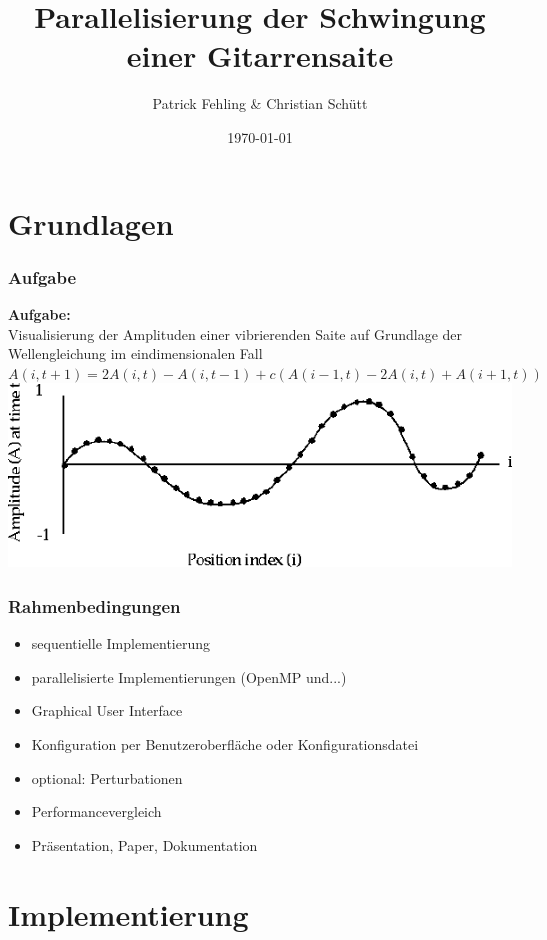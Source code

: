 \documentclass[xcolor=dvipsnames]{beamer}
\title{Parallelisierung der Schwingung einer Gitarrensaite}
\author{Patrick Fehling \& Christian Schütt}
\date{\today}
\begin{document}
\maketitle
\frame{\tableofcontents}

\section{Grundlagen}
\begin{frame}\frametitle{Aufgabe}
		\textbf{Aufgabe:}\\
		Visualisierung der Amplituden einer vibrierenden Saite auf Grundlage der Wellengleichung im eindimensionalen Fall\\
		\vspace{1ex}
		$A(i, t + 1) = 2A(i, t) - A(i, t - 1) + c(A(i - 1, t) - 2A(i, t) + A(i + 1, t))$\\
		\vspace{2ex}
		\includegraphics[width=1.0\textwidth,valign=t]{pictures/wellengleichung_aufgabe}
\end{frame}

\begin{frame}\frametitle{Rahmenbedingungen}
	\begin{itemize}
		\item sequentielle Implementierung
		\item parallelisierte Implementierungen (OpenMP und...)
		\item Graphical User Interface
		\item Konfiguration per Benutzeroberfläche oder Konfigurationsdatei
		\item optional: Perturbationen
		\vspace{3ex}
		\item Performancevergleich
		\item Präsentation, Paper, Dokumentation
	\end{itemize}
\end{frame}

\section{Implementierung}
\frame{\tableofcontents[current]}
\end{document}
